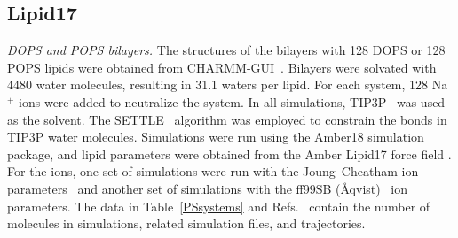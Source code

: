 \documentclass[journal=jpcbfk,manuscript=article]{achemso}
\begin{document}
\subsection{Lipid17}
{\it DOPS and POPS bilayers.} 
The structures of the bilayers with 128 DOPS or 128 POPS lipids were
obtained from CHARMM-GUI~\cite{lee16,jo18}. Bilayers were solvated with
4480 water molecules, resulting in 31.1 waters per lipid. For
each system, 128 Na$^+$ ions were added to neutralize the system.
In all simulations, TIP3P~\cite{jorgensen1983comparison} was used as the solvent. The SETTLE~\cite{miyamoto92} algorithm was employed 
to constrain the bonds in TIP3P water molecules. Simulations were run using the Amber18 simulation package,\cite{amber18md}
and lipid parameters were obtained from the Amber Lipid17 force field \cite{gould18}. For the ions, one set of simulations were run with the Joung--Cheatham
ion parameters~\cite{joung2008determination} and another set of simulations with the ff99SB (\AA{}qvist)~\cite{aqvist90} ion parameters.
The data in Table~\ref{PSsystems} and Refs.~ contain
the number of molecules in simulations, related simulation files, and trajectories.
\end{document}
